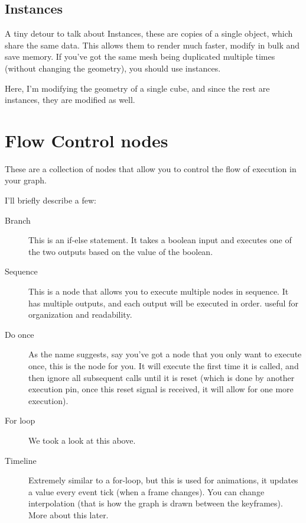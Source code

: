 \documentclass{article}
\begin{document}
\newpage
\subsection{Instances}
A tiny detour to talk about Instances, these are copies of a single object, which share the same data. This allows them to render much faster, modify in bulk and save memory. If you've got the same mesh being duplicated multiple times (without changing the geometry), you should use instances.

Here, I'm modifying the geometry of a single cube, and since the rest are instances, they are modified as well.


\newpage

\section{Flow Control nodes}
These are a collection of nodes that allow you to control the flow of execution in your graph. 


I'll briefly describe a few:

\begin{description}
    \item[Branch] This is an if-else statement. It takes a boolean input and executes one of the two outputs based on the value of the boolean.
    \item[Sequence] This is a node that allows you to execute multiple nodes in sequence. It has multiple outputs, and each output will be executed in order. useful for organization and readability.
    \item[Do once] As the name suggests, say you've got a node that you only want to execute once, this is the node for you. It will execute the first time it is called, and then ignore all subsequent calls until it is reset (which is done by another execution pin, once this reset signal is received, it will allow for one more execution). 
    \item[For loop] We took a look at this above.
    \item[Timeline] Extremely similar to a for-loop, but this is used for animations, it updates a value every event tick (when a frame changes). You can change interpolation (that is how the graph is drawn between the keyframes). More about this later.
\end{description}
\end{document}

